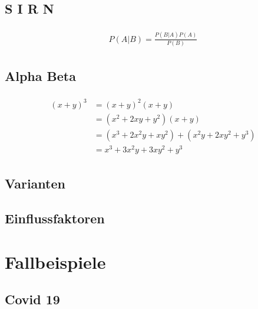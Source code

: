 \documentclass[12pt]{scrartcl} %
\begin{document}
\subsection{S I R N}

\begin{align} 
	\label{eq:bayes}
	\begin{split}
		P(A|B) = \frac{P(B|A)P(A)}{P(B)}
	\end{split}					
\end{align}


\subsection{Alpha Beta}

\begin{align} 
	\begin{split}
		(x+y)^3 &= (x+y)^2(x+y)\\
		&=(x^2+2xy+y^2)(x+y)\\
		&=(x^3+2x^2y+xy^2) + (x^2y+2xy^2+y^3)\\
		&=x^3+3x^2y+3xy^2+y^3
	\end{split}					
\end{align}


\subsection{Varianten}


\subsection{Einflussfaktoren}


\section{Fallbeispiele}

\subsection{Covid 19}

\end{document}
